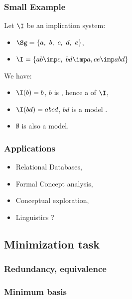 \begin{frame}
\frametitle{Small Example}

Let $\I$ be an implication system:
\begin{itemize}
\item $\Sg = \{ a, \ b, \ c, \ d, \ e \}$,
\item $\I = \{ ab \imp c, \ bd \imp a, ce \imp abd \}$
\end{itemize}

\vspace{1.2em}

We have:
\begin{itemize}
\item $\I(b) = b$, $b$ is , hence a  of $\I$,
\item $\I(bd) = abcd$, $bd$ is  a model \quad 
{}.
\item $\emptyset$ is also a model.
\end{itemize}

\end{frame}

\begin{frame}
\frametitle{Applications}

\begin{itemize}
\item Relational Databases,
\item Formal Concept analysis,
\item Conceptual exploration,
\item Linguistics ?
\end{itemize}
\end{frame}




\subsection{Minimization task}

\begin{frame}
\frametitle{Redundancy, equivalence}

\end{frame}


\begin{frame}
\frametitle{Minimum basis}




\end{frame}
